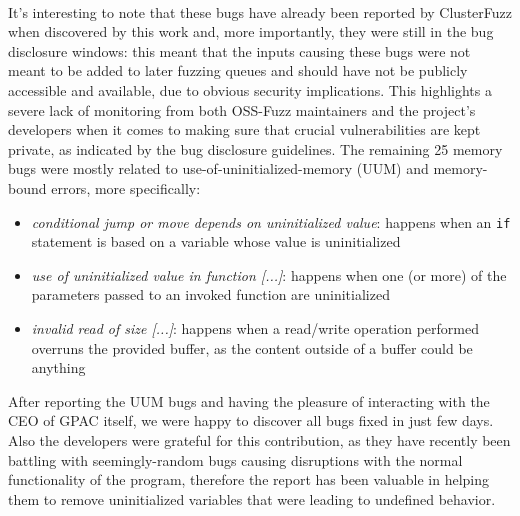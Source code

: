 \ \\
It's interesting to note that these bugs have already been reported by ClusterFuzz when discovered by this work and, more importantly, they were still in the bug disclosure windows: this meant that the inputs causing these bugs were not meant to be added to later fuzzing queues and should have not be publicly accessible and available, due to obvious security implications. This highlights a severe lack of monitoring from both OSS-Fuzz maintainers and the project's developers when it comes to making sure that crucial vulnerabilities are kept private, as indicated by the bug disclosure guidelines.  The remaining 25 memory bugs were mostly related to use-of-uninitialized-memory (UUM) and memory-bound errors, more specifically:
\begin{itemize}
    \item \textit{conditional jump or move depends on uninitialized value}: happens when an \verb|if| statement is based on a variable whose value is uninitialized
    \item \textit{use of uninitialized value in function [...]}: happens when one (or more) of the parameters passed to an invoked function are uninitialized
    \item \textit{invalid read of size [...]}: happens when a read/write operation performed overruns the provided buffer, as the content outside of a buffer could be anything
\end{itemize}

After reporting the UUM bugs and having the pleasure of interacting with the CEO of GPAC itself, we were happy to discover all bugs fixed in just few days. Also the developers were grateful for this contribution, as they have recently been battling with seemingly-random bugs causing disruptions with the normal functionality of the program, therefore the report has been valuable in helping them to remove uninitialized variables that were leading to undefined behavior.




